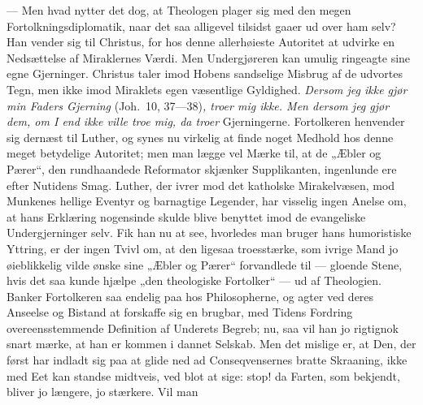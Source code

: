 \documentclass[12pt,a4paper]{book}
\begin{document}
--- Men hvad nytter det dog, at Theologen plager sig med den megen Fortolkningsdiplomatik,
naar det saa alligevel tilsidst gaaer ud over ham selv? Han vender sig til Christus, for hos
denne allerhøieste Autoritet at udvirke en Nedsættelse af Miraklernes Værdi. Men
Undergjøreren kan umulig ringeagte sine egne Gjerninger. Christus taler imod Hobens sandselige
Misbrug af
de udvortes Tegn, men ikke imod Miraklets egen væsentlige Gyldighed.
\emph{Dersom jeg ikke gjør min Faders Gjerning} (Joh.\ 10, 37---38)\emph{, troer mig ikke.
Men dersom jeg gjør dem, om I end ikke ville troe mig, da troer} Gjerningerne. Fortolkeren
henvender sig dernæst til Luther, og synes nu virkelig at finde noget Medhold hos denne meget
betydelige Autoritet; men man lægge vel Mærke til, at de „Æbler og Pærer“, den rundhaandede
Reformator skjænker Supplikanten, ingenlunde ere efter Nutidens Smag. Luther, der ivrer mod
det katholske Mirakelvæsen, mod Munkenes hellige Eventyr og barnagtige Legender, har visselig
ingen Anelse om, at hans Erklæring nogensinde skulde blive benyttet imod de evangeliske
Undergjerninger selv. Fik han nu at see, hvorledes man bruger hans humoristiske Yttring, er
der ingen Tvivl om, at den ligesaa troesstærke, som ivrige Mand jo øieblikkelig vilde ønske
sine „Æbler og Pærer“ forvandlede til --- gloende Stene, hvis det saa kunde hjælpe „den
theologiske Fortolker“ --- ud af Theologien. Banker Fortolkeren saa endelig paa hos
Philosopherne, og agter ved deres Anseelse og Bistand at forskaffe sig en brugbar, med Tidens
Fordring overeensstemmende Definition af Underets Begreb; nu, saa vil han jo rigtignok snart
mærke, at han er kommen i dannet Selskab. Men det mislige er, at Den, der først har indladt
sig paa at glide ned ad Conseqvensernes bratte Skraaning, ikke med Eet kan standse midtveis,
ved blot at sige: stop! da Farten, som bekjendt, bliver jo længere, jo stærkere. Vil man
\end{document}
